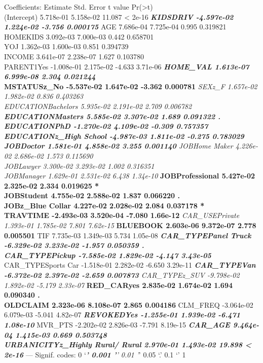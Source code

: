 \documentclass[]{article}
\begin{document}
Coefficients: Estimate Std. Error t value
Pr(\textgreater{}\textbar{}t\textbar{})\\
(Intercept) 5.718e-01 5.158e-02 11.087 \textless{} 2e-16 \textbf{\emph{
KIDSDRIV -4.597e-02 1.224e-02 -3.756 0.000175 }} AGE 7.686e-04 7.725e-04
0.995 0.319821\\
HOMEKIDS 3.092e-03 7.000e-03 0.442 0.658701\\
YOJ 1.362e-03 1.600e-03 0.851 0.394739\\
INCOME 3.641e-07 2.238e-07 1.627 0.103780\\
PARENT1Yes -1.008e-01 2.175e-02 -4.633 3.71e-06 \textbf{\emph{ HOME\_VAL
1.613e-07 6.999e-08 2.304 0.021244 }\\
MSTATUSz\_No -5.537e-02 1.647e-02 -3.362 0.000781 }\emph{ SEXz\_F
1.657e-02 1.982e-02 0.836 0.403263\\
EDUCATIONBachelors 5.935e-02 2.191e-02 2.709 0.006782 \textbf{
EDUCATIONMasters 5.585e-02 3.307e-02 1.689 0.091322 .\\
EDUCATIONPhD -1.270e-02 4.109e-02 -0.309 0.757357\\
EDUCATIONz\_High School -4.987e-03 1.811e-02 -0.275 0.783029\\
JOBDoctor 1.581e-01 4.858e-02 3.255 0.001140 } JOBHome Maker 4.226e-02
2.686e-02 1.573 0.115690\\
JOBLawyer 3.300e-02 3.293e-02 1.002 0.316351\\
JOBManager 1.629e-01 2.531e-02 6.438 1.34e-10 }\textbf{ JOBProfessional
5.427e-02 2.325e-02 2.334 0.019625 *\\
JOBStudent 4.755e-02 2.588e-02 1.837 0.066220 .\\
JOBz\_Blue Collar 4.227e-02 2.028e-02 2.084 0.037178 *\\
TRAVTIME -2.493e-03 3.520e-04 -7.080 1.66e-12 }\emph{ CAR\_USEPrivate
1.393e-01 1.785e-02 7.801 7.62e-15 }\textbf{ BLUEBOOK 2.603e-06
9.372e-07 2.778 0.005501 } TIF 7.735e-03 1.349e-03 5.734 1.05e-08
\textbf{\emph{ CAR\_TYPEPanel Truck -6.329e-02 3.233e-02 -1.957 0.050359
.\\
CAR\_TYPEPickup -7.585e-02 1.829e-02 -4.147 3.43e-05 }} CAR\_TYPESports
Car -1.518e-01 2.282e-02 -6.650 3.29e-11 \emph{\textbf{ CAR\_TYPEVan
-6.372e-02 2.397e-02 -2.659 0.007873 } CAR\_TYPEz\_SUV -9.798e-02
1.892e-02 -5.179 2.33e-07 }\textbf{ RED\_CARyes 2.835e-02 1.674e-02
1.694 0.090340 .\\
OLDCLAIM 2.323e-06 8.108e-07 2.865 0.004186 } CLM\_FREQ -3.064e-02
6.079e-03 -5.041 4.82e-07 \textbf{\emph{ REVOKEDYes -1.255e-01 1.939e-02
-6.471 1.08e-10 }} MVR\_PTS -2.202e-02 2.826e-03 -7.791 8.19e-15
\textbf{\emph{ CAR\_AGE 9.464e-04 1.415e-03 0.669 0.503748\\
URBANICITYz\_Highly Rural/ Rural 2.970e-01 1.493e-02 19.898 \textless{}
2e-16 }} --- Signif. codes: 0 `\emph{\textbf{' 0.001 '}' 0.01 '}' 0.05
`.' 0.1 `' 1
\end{document}
